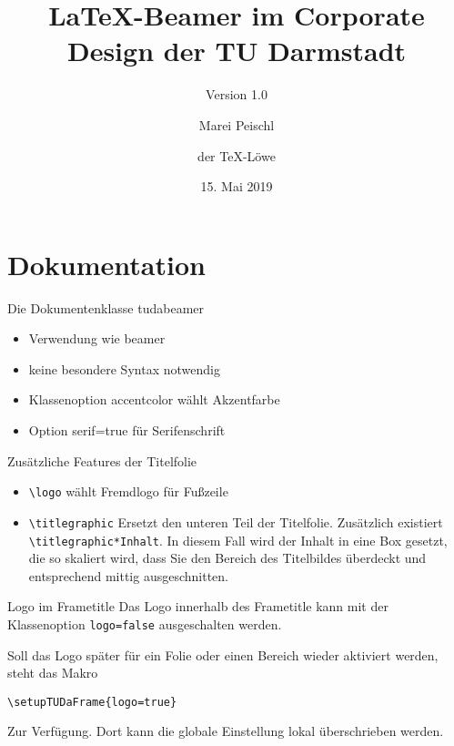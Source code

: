 \documentclass[
	ngerman,%
	aspectratio=169,%
	color={accentcolor=2d},
	logo=false,%
	colorframetitle=true,%
	]{tudabeamer}
\let\code\texttt
\begin{document}
\title{LaTeX-Beamer im Corporate Design der TU Darmstadt}
\subtitle{Version 1.0}
\author[M. Peischl]{Marei Peischl \and der \TeX-Löwe}
\department{\TeX/\LaTeX}




\date{15. Mai 2019}

\maketitle


\section{Dokumentation}
\begin{frame}{Die Dokumentenklasse tudabeamer}
\begin{itemize}
	\item Verwendung wie beamer
	\item keine besondere Syntax notwendig
	\item Klassenoption accentcolor wählt Akzentfarbe
	\item Option serif=true für Serifenschrift
\end{itemize}
\end{frame}

\begin{frame}{Zusätzliche Features der Titelfolie}
\begin{itemize}
	\item \code{\textbackslash{}logo} wählt Fremdlogo für Fußzeile
	\item \code{\textbackslash{}titlegraphic} Ersetzt den unteren Teil der Titelfolie. Zusätzlich existiert \code{\textbackslash{}titlegraphic*{Inhalt}}.
	In diesem Fall wird der Inhalt in eine Box gesetzt, die so skaliert wird, dass Sie den Bereich des Titelbildes überdeckt und entsprechend mittig ausgeschnitten.
\end{itemize}
\end{frame}

\begin{frame}[fragile]{Logo im Frametitle}
Das Logo innerhalb des Frametitle kann mit der Klassenoption \code{logo=false} ausgeschalten werden.

Soll das Logo später für ein Folie oder einen Bereich wieder aktiviert werden, steht das Makro
\begin{verbatim}
\setupTUDaFrame{logo=true}
\end{verbatim}
Zur Verfügung. Dort kann die globale Einstellung lokal überschrieben werden.
\end{frame}
\end{document}
